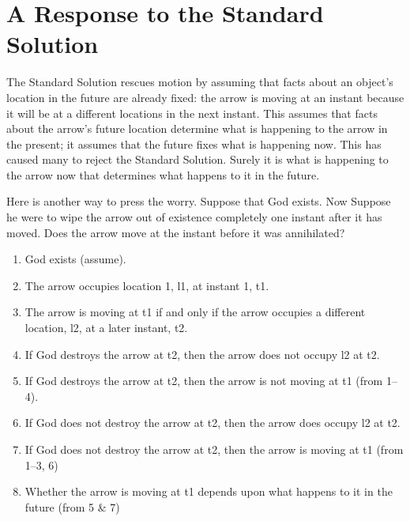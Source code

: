 \documentclass[oneside]{article}
\begin{document}







\section*{A Response to the Standard Solution}

The Standard Solution rescues motion by assuming that facts  about an object's location in the future are already fixed: the arrow is moving at an instant because it will be at a different locations in the next instant. This assumes that facts about the arrow's future location determine what is happening to the arrow in the present; it assumes that the future fixes what is happening now. This has caused many to reject the Standard Solution. Surely it is what is happening to the arrow now that determines what happens to it in the future.  

Here is another way to press the worry. Suppose that God exists. Now Suppose he were to wipe the arrow out of existence completely one instant after it has moved. Does the arrow move at the instant before it was annihilated?  

\begin{enumerate}
\item God exists (assume).
\item The arrow occupies location 1, l1, at instant 1, t1.
\item The arrow is moving at t1 if and only if the arrow occupies a different location, l2, at a later instant, t2. 
\item If God destroys the arrow at t2, then the arrow does not occupy l2 at t2.
\item If God destroys the arrow at t2, then the arrow is not moving at t1 (from 1--4).
\item If God does not destroy the arrow at t2, then the arrow does occupy l2 at t2. 
\item If God does not destroy the arrow at t2, then the arrow is moving at t1 (from 1--3, 6)
\item Whether the arrow is moving at t1 depends upon what happens to it in the future (from 5 \& 7) 
\end{enumerate}
\end{document}
